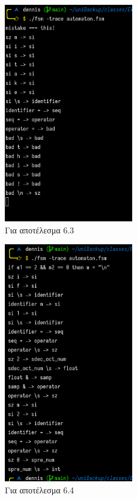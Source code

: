 \documentclass[14pt]{extarticle}
\begin{document}
\begin{figure}[h]
  \caption{Για αποτέλεσμα 6.3}
  \centering
  \includegraphics[width=0.5\textwidth]{test_mistake}
\end{figure}

\begin{figure}[hc]
  \caption{Για αποτέλεσμα 6.4}
  \centering
  \includegraphics[width=0.5\textwidth]{test_if}
\end{figure}
\end{document}
